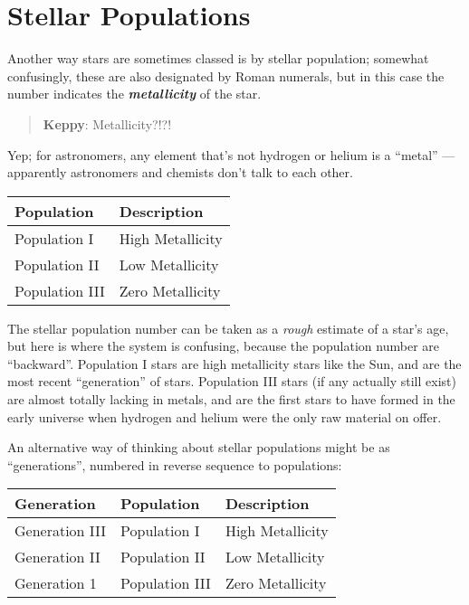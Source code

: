 \documentclass[
  letterpaper,
]{book}
\begin{document}
\chapter{Stellar Populations}\label{stellar-populations}

Another way stars are sometimes classed is by stellar population;
somewhat confusingly, these are also designated by Roman numerals, but
in this case the number indicates the \textbf{\emph{metallicity}} of the
star.

\begin{quote}
\textbf{Keppy}: Metallicity?!?!
\end{quote}

Yep; for astronomers, any element that's not hydrogen or helium is a
``metal'' --- apparently astronomers and chemists don't talk to each
other.

\begin{longtable}[]{@{}ll@{}}
\toprule\noalign{}
Population & Description \\
\midrule\noalign{}
\endhead
\bottomrule\noalign{}
\endlastfoot
Population I & High Metallicity \\
Population II & Low Metallicity \\
Population III & Zero Metallicity \\
\end{longtable}

The stellar population number can be taken as a \emph{rough} estimate of
a star's age, but here is where the system is confusing, because the
population number are ``backward''. Population I stars are high
metallicity stars like the Sun, and are the most recent ``generation''
of stars. Population III stars (if any actually still exist) are almost
totally lacking in metals, and are the first stars to have formed in the
early universe when hydrogen and helium were the only raw material on
offer.

An alternative way of thinking about stellar populations might be as
``generations'', numbered in reverse sequence to populations:

\begin{longtable}[]{@{}lll@{}}
\toprule\noalign{}
Generation & Population & Description \\
\midrule\noalign{}
\endhead
\bottomrule\noalign{}
\endlastfoot
Generation III & Population I & High Metallicity \\
Generation II & Population II & Low Metallicity \\
Generation 1 & Population III & Zero Metallicity \\
\end{longtable}
\end{document}
